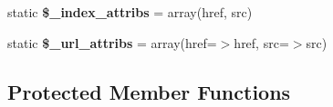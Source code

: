 \begin{DoxyCompactItemize}
\item 
\mbox{\label{classduzun_1_1hQuery_1_1HTML__Parser_a330e322fa6ec111cf2830520450699ed}} 
static {\bfseries \$\+\_\+index\+\_\+attribs} = array(\textquotesingle{}href\textquotesingle{}, \textquotesingle{}src\textquotesingle{})
\item 
\mbox{\label{classduzun_1_1hQuery_1_1HTML__Parser_a2726cbbeb2e78ac6ef9675e2f05d9d15}} 
static {\bfseries \$\+\_\+url\+\_\+attribs} = array(\textquotesingle{}href\textquotesingle{}=$>$\textquotesingle{}href\textquotesingle{}, \textquotesingle{}src\textquotesingle{}=$>$\textquotesingle{}src\textquotesingle{})
\end{DoxyCompactItemize}
\subsection*{Protected Member Functions}
